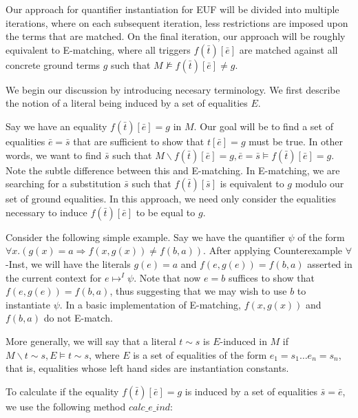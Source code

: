 \documentclass{llncs}
\begin{document}
Our approach for quantifier instantiation for EUF will be divided into multiple iterations, where on each subsequent iteration, less restrictions are imposed upon the terms that are matched.
On the final iteration, our approach will be roughly equivalent to E-matching, where all triggers $f( \bar{t} )[\bar{e}]$ are matched against all concrete ground terms $g$ such that $M \not\models f( \bar{t} )[\bar{e}] \neq g$.

We begin our discussion by introducing necesary terminology.
We first describe the notion of a literal being induced by a set of equalities $E$.

Say we have an equality $f( \bar{t} )[\bar{e}] = g$ in $M$.
Our goal will be to find a set of equalities $\bar{e} = \bar{s}$ that are sufficient to show that $t[\bar{e}] = g$ must be true.
In other words, we want to find $\bar{s}$ such that $M \backslash f( \bar{t} )[\bar{e}] = g, \bar{e} = \bar{s} \models f( \bar{t} )[\bar{e}] = g$.
Note the subtle difference between this and E-matching.
In E-matching, we are searching for a substitution $\bar{s}$ such that $f( \bar{t} )[\bar{s}]$ is equivalent to $g$ modulo our set of ground equalities.
In this approach, we need only consider the equalities necessary to induce $f( \bar{t} )[\bar{e}]$ to be equal to $g$.

Consider the following simple example.
Say we have the quantifier $\psi$ of the form $\forall x. (g(x) = a \Rightarrow f( x, g( x ) ) \neq f( b, a ))$.
After applying Counterexample $\forall$-Inst, we will have the literals $g(e) = a$ and $f( e, g( e ) ) = f( b, a )$ asserted in the current context for $e \mapsto^I \psi$.
Note that now $e = b$ suffices to show that $f( e, g( e ) ) = f( b, a )$, thus suggesting that we may wish to use $b$ to instantiate $\psi$.
In a basic implementation of E-matching, $f( x, g( x ) )$ and $f( b, a )$ do not E-match.

More generally, we will say that a literal $t \sim s$ is $E$-induced in $M$ if $M \backslash t \sim s, E \models t \sim s$, where $E$ is a set of equalities of the form $e_1 = s_1 \ldots e_n = s_n$, that is, equalities whose left hand sides are instantiation constants.

To calculate if the equality $f( \bar{t} )[\bar{e}] = g$ is induced by a set of equalities $\bar{s} = \bar{e}$, we use the following method $calc\_e\_ind$:
\end{document}
